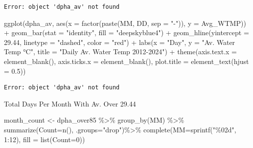 \documentclass[
  letterpaper,
  DIV=11,
  numbers=noendperiod]{scrreprt}
\newenvironment{Shaded}{\begin{snugshade}}{\end{snugshade}}
\newcommand{\AttributeTok}[1]{\textcolor[rgb]{0.40,0.45,0.13}{#1}}
\newcommand{\DecValTok}[1]{\textcolor[rgb]{0.68,0.00,0.00}{#1}}
\newcommand{\FloatTok}[1]{\textcolor[rgb]{0.68,0.00,0.00}{#1}}
\newcommand{\FunctionTok}[1]{\textcolor[rgb]{0.28,0.35,0.67}{#1}}
\newcommand{\NormalTok}[1]{\textcolor[rgb]{0.00,0.23,0.31}{#1}}
\newcommand{\OtherTok}[1]{\textcolor[rgb]{0.00,0.23,0.31}{#1}}
\newcommand{\SpecialCharTok}[1]{\textcolor[rgb]{0.37,0.37,0.37}{#1}}
\newcommand{\StringTok}[1]{\textcolor[rgb]{0.13,0.47,0.30}{#1}}
\begin{document}
\begin{verbatim}
Error: object 'dpha_av' not found
\end{verbatim}

\begin{Shaded}
\begin{Highlighting}[]
\FunctionTok{ggplot}\NormalTok{(dpha\_av, }\FunctionTok{aes}\NormalTok{(}\AttributeTok{x =} \FunctionTok{factor}\NormalTok{(}\FunctionTok{paste}\NormalTok{(MM, DD, }\AttributeTok{sep =} \StringTok{"{-}"}\NormalTok{)), }\AttributeTok{y =}\NormalTok{ Avg\_WTMP)) }\SpecialCharTok{+}
  \FunctionTok{geom\_bar}\NormalTok{(}\AttributeTok{stat =} \StringTok{"identity"}\NormalTok{, }\AttributeTok{fill =} \StringTok{"deepskyblue4"}\NormalTok{) }\SpecialCharTok{+} 
  \FunctionTok{geom\_hline}\NormalTok{(}\AttributeTok{yintercept =} \FloatTok{29.44}\NormalTok{, }\AttributeTok{linetype =} \StringTok{"dashed"}\NormalTok{, }\AttributeTok{color =} \StringTok{"red"}\NormalTok{) }\SpecialCharTok{+}
  \FunctionTok{labs}\NormalTok{(}\AttributeTok{x =} \StringTok{"Day"}\NormalTok{, }\AttributeTok{y =} \StringTok{"Av. Water Temp °C"}\NormalTok{, }\AttributeTok{title =} \StringTok{"Daily Av. Water Temp 2012{-}2024"}\NormalTok{) }\SpecialCharTok{+}
  \FunctionTok{theme}\NormalTok{(}\AttributeTok{axis.text.x =} \FunctionTok{element\_blank}\NormalTok{(),  }
        \AttributeTok{axis.ticks.x =} \FunctionTok{element\_blank}\NormalTok{(), }
        \AttributeTok{plot.title =} \FunctionTok{element\_text}\NormalTok{(}\AttributeTok{hjust =} \FloatTok{0.5}\NormalTok{))}
\end{Highlighting}
\end{Shaded}

\begin{verbatim}
Error: object 'dpha_av' not found
\end{verbatim}

Total Days Per Month With Av. Over 29.44

\begin{Shaded}
\begin{Highlighting}[]
\NormalTok{month\_count }\OtherTok{\textless{}{-}}\NormalTok{ dpha\_over85 }\SpecialCharTok{\%\textgreater{}\%}
  \FunctionTok{group\_by}\NormalTok{(MM) }\SpecialCharTok{\%\textgreater{}\%}
  \FunctionTok{summarize}\NormalTok{(}\AttributeTok{Count=}\FunctionTok{n}\NormalTok{(), }\AttributeTok{.groups=}\StringTok{"drop"}\NormalTok{)}\SpecialCharTok{\%\textgreater{}\%}
  \FunctionTok{complete}\NormalTok{(}\AttributeTok{MM=}\FunctionTok{sprintf}\NormalTok{(}\StringTok{"\%02d"}\NormalTok{, }\DecValTok{1}\SpecialCharTok{:}\DecValTok{12}\NormalTok{), }\AttributeTok{fill =} \FunctionTok{list}\NormalTok{(}\AttributeTok{Count=}\DecValTok{0}\NormalTok{))}
\end{Highlighting}
\end{Shaded}
\end{document}
